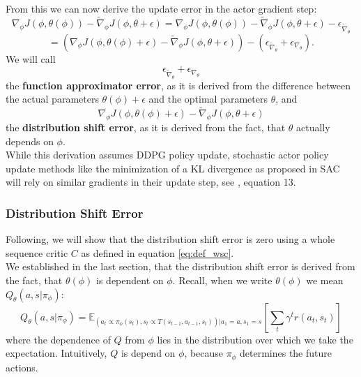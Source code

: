 From this we can now derive the update error in the actor gradient step:
\begin{equation}
    \label{equation:general_update_error}
    \nabla_{\phi} J(\phi, \theta(\phi)) - \widetilde{\nabla}_\phi J(\phi, \theta + \epsilon) = \nabla_{\phi} J(\phi, \theta(\phi)) - \widetilde{\nabla}_\phi J(\phi, \theta + \epsilon) - \epsilon_{\widetilde{\nabla}_{\theta}}
\end{equation}
\begin{equation*}
    = \left(\nabla_{\phi} J(\phi, \theta(\phi) + \epsilon) - \widetilde{\nabla}_\phi J(\phi, \theta + \epsilon)\right) - \left( \epsilon_{\widetilde{\nabla}_{\theta}} + \epsilon_{\nabla_{\theta}} \right).
\end{equation*}
We will call 
\begin{equation}
    \label{eq:def_func_app_err}
     \epsilon_{\widetilde{\nabla}_{\theta}} + \epsilon_{\nabla_{\theta}}
\end{equation}
the \textbf{function approximator error}, as it is derived from the difference between 
the actual parameters $\theta(\phi) +\epsilon$ and the optimal parameters $\theta$, and \\
\begin{equation}
    \label{eq:def_di_sh_err}
    \nabla_{\phi} J(\phi, \theta(\phi) + \epsilon) - \widetilde{\nabla}_\phi J(\phi, \theta + \epsilon)
\end{equation}
the \textbf{distribution shift error}, as it is derived from the fact, that $\theta$ actually depends on $\phi$. \\
While this derivation assumes DDPG policy update, stochastic actor policy update methods like the minimization of a KL divergence as 
proposed in SAC will rely on similar gradients in their update step, see \cite{haarnoja2018soft}, equation 13.

\subsubsection{Distribution Shift Error}
\label{dist_shift_error_section}
Following, we will show that the distribution shift error is zero using a whole sequence critic $C$ as defined in equation \ref{eq:def_wsc}. \\ 

We established in the last section, that the distribution shift error is derived from the fact, that $\theta(\phi)$ is dependent on $\phi$. 
Recall, when we write $\theta(\phi)$ we mean $Q_{\theta}(a,s|\pi_{\phi})$:
\begin{equation*}
    Q_{\theta}(a,s|\pi_{\phi}) = \mathbb{E}_{(a_t \propto \pi_{\phi}(s_t), s_t \propto T(s_{t-1}, a_{t-1}, s_t))|a_1=a, s_1=s}\left[\sum_t \gamma^t r(a_t, s_t)\right]
\end{equation*}
where the dependence of $Q$ from $\phi$ lies in the distribution over which we take the expectation. Intuitively, $Q$ is depend on $\phi$, because $\pi_{\phi}$ determines the 
future actions.\\ 

